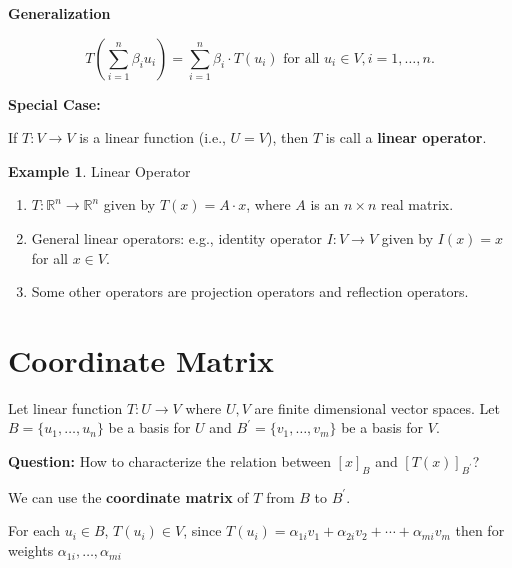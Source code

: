 \documentclass[12pt]{article}
\theoremstyle{definition}
\newtheorem*{example}{Example}
\begin{document}
\noindent \textbf{Generalization}

\[ T \left( \sum^{n}_{i = 1} \beta_i u_i \right) = \sum^n_{i = 1} \beta_i \cdot T(u_i)
\text{ for all } u_i \in V,i = 1, \ldots, n. \]

\noindent \textbf{Special Case:}

If $T: V \rightarrow V$ is a linear function (i.e., $U = V$), then $T$ is call a
\textbf{linear operator}.

\begin{example} Linear Operator

\begin{enumerate}[label = (\arabic*)]

\item $T : \mathbb{R}^n \rightarrow \mathbb{R}^n$ given by $T(x) = A \cdot x$, where
$A$ is an $n \times n$ real matrix.

\item General linear operators: e.g., identity operator $I : V \rightarrow V$ given by
$I(x) = x$ for all $x \in V$.

\item Some other operators are projection operators and reflection operators.

\end{enumerate}

\end{example}

\section{Coordinate Matrix}

Let linear function $T: U \rightarrow V$ where $U, V$ are finite dimensional vector spaces.
Let $B = \{u_1, \ldots, u_n\}$ be a basis for $U$ and $B^{\prime} = \{v_1, \ldots, v_m \}$
be a basis for $V$.


\vspace{0.2cm}

\noindent \textbf{Question:} How to characterize the relation between $[x]_B$ and 
$[T(x)]_{B^{\prime}}$? 

\vspace{0.2cm}

We can use the \textbf{coordinate matrix} of $T$ from $B$ to $B^{\prime}$.

\vspace{0.2cm}

For each $u_i \in B$, $T(u_i) \in V$, since
$T(u_i) = \alpha_{1i} v_1 + \alpha_{2i} v_2 + \cdots + \alpha_{mi} v_m$ then
for weights $\alpha_{1i}, \ldots, \alpha_{mi}$
\end{document}
